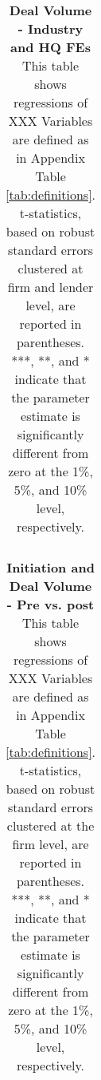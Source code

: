 \begin{table}[H] \begin{center} 
		\caption{\textbf{Deal Volume - Industry and HQ FEs} \\ This table shows regressions of XXX Variables are defined as in Appendix Table \ref{tab:definitions}. t-statistics, based on robust standard errors clustered at firm and lender level, are reported in parentheses. ***, **, and * indicate that the parameter estimate is significantly different from zero at the 1\%, 5\%, and 10\% level, respectively. } %
		\label{tab:volume_Var_FE} 
		\begin{threeparttable}  \def\sym#1{\ifmmode^{#1}\else\(^{#1}\)\fi}
			\begin{tabular*}{\hsize}{@{\hskip\tabcolsep\extracolsep\fill}l*{6}{c}} \toprule
				 
				\bottomrule \end{tabular*}
\end{threeparttable}   \end{center} \end{table}
\clearpage \newpage


\begin{table}[H] \begin{center} 
		\caption{\textbf{Initiation and Deal Volume - Pre vs. post} \\ This table shows regressions of XXX Variables are defined as in Appendix Table \ref{tab:definitions}. t-statistics, based on robust standard errors clustered at the firm level, are reported in parentheses. ***, **, and * indicate that the parameter estimate is significantly different from zero at the 1\%, 5\%, and 10\% level, respectively. } %
		\label{tab:collapsed} 
		\begin{threeparttable}  \def\sym#1{\ifmmode^{#1}\else\(^{#1}\)\fi}
			\begin{tabular*}{\hsize}{@{\hskip\tabcolsep\extracolsep\fill}l*{6}{c}} \toprule
				 
				\bottomrule \end{tabular*}
\end{threeparttable}   \end{center} \end{table}
\clearpage \newpage

